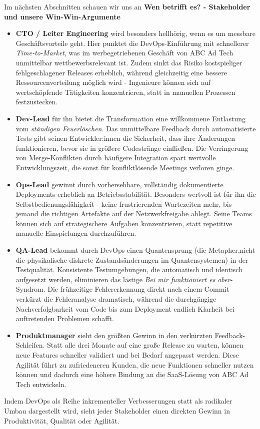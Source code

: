 Im nächsten Abschnitten schauen wir uns an \textbf{Wen betrifft es? - Stakeholder und unsere Win-Win-Argumente}
\begin{itemize}
    \item \textbf{CTO / Leiter Engineering} wird besonders hellhörig, wenn es um messbare Geschäftsvorteile geht. Hier punktet die DevOps-Einführung mit schnellerer \textit{Time-to-Market}, was im werbegetriebenen Geschäft von ABC Ad Tech unmittelbar wettbewerbsrelevant ist. Zudem sinkt das Risiko kostspieliger fehlgeschlagener Releases erheblich, während gleichzeitig eine bessere Ressourcenverteilung möglich wird - Ingenieure können sich auf wertschöpfende Tätigkeiten konzentrieren, statt in manuellen Prozessen festzustecken.
    \item \textbf{Dev-Lead} für ihn bietet die Transformation eine willkommene Entlastung vom \textit{ständigen Feuerlöschen}. Das unmittelbare Feedback durch automatisierte Tests gibt seinen Entwickler:innen die Sicherheit, dass ihre Änderungen funktionieren, bevor sie in größere Codestränge einfließen. Die Verringerung von Merge-Konflikten durch häufigere Integration spart wertvolle Entwicklungszeit, die sonst für konfliktlösende Meetings verloren ginge.
    \item \textbf{Ops-Lead} gewinnt durch vorhersehbare, vollständig dokumentierte Deployments erheblich an Betriebsstabilität. Besonders wertvoll ist für ihn die Selbstbedienungsfähigkeit - keine frustrierenden Wartezeiten mehr, bis jemand die richtigen Artefakte auf der Netzwerkfreigabe ablegt. Seine Teams können sich auf strategischere Aufgaben konzentrieren, statt repetitive manuelle Einspielungen durchzuführen.
    \item \textbf{QA-Lead} bekommt durch DevOps einen Quantensprung (die Metapher,nicht die physikalische diskrete Zustandsänderungen im Quantensystemen) in der Testqualität. Konsistente Testumgebungen, die automatisch und identisch aufgesetzt werden, eliminieren das lästige \textit{Bei mir funktioniert es aber}-Syndrom. Die frühzeitige Fehlererkennung direkt nach einem Commit verkürzt die Fehleranalyse dramatisch, während die durchgängige Nachverfolgbarkeit vom Code bis zum Deployment endlich Klarheit bei auftretenden Problemen schafft.
    \item \textbf{Produktmanager } sieht den größten Gewinn in den verkürzten Feedback-Schleifen. Statt alle drei Monate auf eine große Release zu warten, können neue Features schneller validiert und bei Bedarf angepasst werden. Diese Agilität führt zu zufriedeneren Kunden, die neue Funktionen schneller nutzen können und dadurch eine höhere Bindung an die SaaS-Lösung von ABC Ad Tech entwickeln.
\end{itemize}
Indem DevOps als Reihe inkrementeller Verbesserungen statt als radikaler Umbau dargestellt wird, sieht jeder Stakeholder einen direkten Gewinn in Produktivität, Qualität oder Agilität. \\
